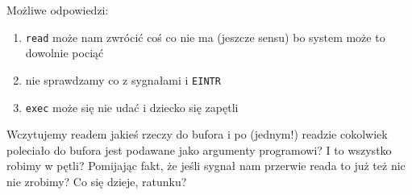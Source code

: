Możliwe odpowiedzi:
\begin{enumerate}
    \item \texttt{read} może nam zwrócić coś co nie ma (jeszcze sensu) bo system może to dowolnie pociąć
    \item nie sprawdzamy co z sygnałami i \texttt{EINTR}
    \item \texttt{exec} może się nie udać i dziecko się zapętli
\end{enumerate}

Wczytujemy readem jakieś rzeczy do bufora i po (jednym!) readzie cokolwiek poleciało do bufora jest podawane jako argumenty programowi? I to wszystko robimy w pętli? Pomijając fakt, że jeśli sygnał nam przerwie reada to już też nic nie zrobimy? Co się dzieje, ratunku?

